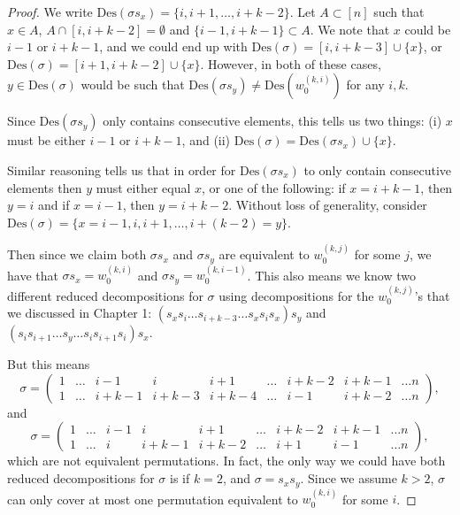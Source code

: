 \documentclass[11pt,reqno]{amsart}
\theoremstyle{definition}
\newtheorem{definition}[theorem]{Definition}
\theoremstyle{notation}
\newcommand{\Des}{\text{Des}}
\begin{document}
\begin{proof}
We write $\Des(\sigma s_x) = \{ i, i+1, \ldots , i+k-2\}$. Let $A\subset [n]$ such that $x\in A$, $A\cap [i,i+k-2] =\emptyset$ and $\{i-1,i+k-1\}\subset A$. We note that $x$ could be $i-1$ or $i+k-1$, and we could end up with $\Des(\sigma) = [i,i+k-3]\cup \{x\}$, or $\Des(\sigma) = [i+1, i+k-2] \cup \{x\}$. However, in both of these cases, $y\in \Des(\sigma)$ would be such that $\Des(\sigma s_y) \neq \Des(w_0^{(k,i)})$ for any $i,k$. 

Since $\Des(\sigma s_y)$ only contains consecutive elements, this tells us two things: (i) $x$ must be either $i-1$ or $i+k-1$, and (ii) $\Des(\sigma) = \Des(\sigma s_x) \cup \{x\} $.

Similar reasoning tells us that in order for $\Des(\sigma s_x)$ to only contain consecutive elements then $y$ must either equal $x$, or one of the following: if $x=i+k-1$, then $y=i$ and if $x=i-1$, then $y=i+k-2$. Without loss of generality, consider $\Des(\sigma ) = \{x=i-1, i, i+1, \ldots, i+(k-2)=y\}$. 

Then since we claim both $\sigma s_x$ and $\sigma s_y$ are equivalent to $w_0^{(k,j)}$ for some $j$, we have that $\sigma s_x = w_0^{(k,i)}$ and $\sigma s_y = w_0^{(k,i-1)}$. This also means we know two different reduced decompositions for $\sigma$ using decompositions for the $w_0^{(k,j)}$'s that we discussed in Chapter 1: $(s_xs_i\ldots s_{i+k-3}\ldots s_xs_is_x)s_y$ and $(s_is_{i+1}\ldots s_y\ldots s_is_{i+1} s_i)s_x$.


But this means
\[ 
\sigma = \left ( \begin{array}{cccccccccc} 1 & \ldots &i-1 & i & i+1 & \ldots & i+k-2 & i+k -1& \ldots n \\
1 & \ldots &  i+k-1 & i+k-3 & i+k-4 & \ldots &  i-1& i+k-2 & \ldots n
\end{array}\right ),
\] 
and
\[ 
\sigma =\left ( \begin{array}{cccccccccc} 1 & \ldots &i-1 & i & i+1 & \ldots & i+k-2 & i+k -1 & \ldots n \\
1 & \ldots & i&   i+k-1 & i+k-2 & \ldots & i+1 &  i-1 & \ldots n
\end{array}\right ),
\] 
which are not equivalent permutations. In fact, the only way we could have both reduced decompositions for $\sigma$ is if $k=2$, and $\sigma = s_x s_y$. Since we assume $k>2$, $\sigma$ can only cover at most one permutation equivalent to $w_0^{(k,i)}$ for some $i$.
\end{proof}



\end{document}
